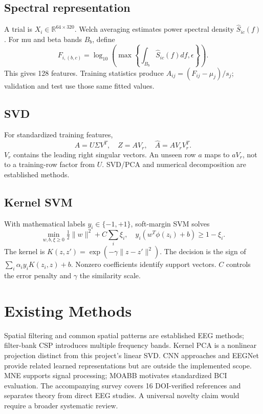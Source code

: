\documentclass[conference]{IEEEtran}
\begin{document}
\subsection{Spectral representation}
A trial is $X_i\in\mathbb{R}^{64\times320}$. Welch averaging estimates power spectral
density $\widehat S_{ic}(f)$\cite{ref13}. For mu and beta bands $B_b$, define
\begin{equation}
F_{i,(b,c)}=\log_{10}\left(\max\left\{\int_{B_b}\widehat S_{ic}(f)df,\epsilon\right\}\right).
\end{equation}
This gives 128 features. Training statistics produce
$A_{ij}=(F_{ij}-\mu_j)/s_j$; validation and test use those same fitted values.
\subsection{SVD}
For standardized training features,
\begin{equation}
A=U\Sigma V^T,\quad Z=AV_r,\quad \widehat A=AV_rV_r^T.
\end{equation}
$V_r$ contains the leading right singular vectors. An unseen row $a$ maps to
$aV_r$, not to a training-row factor from $U$. SVD/PCA and numerical decomposition
are established methods\cite{ref10,ref11,ref12}.
\subsection{Kernel SVM}
With mathematical labels $y_i\in\{-1,+1\}$, soft-margin SVM solves\cite{ref7,ref8}
\begin{equation}
\min_{w,b,\xi\geq0}\tfrac12\|w\|^2+C\sum_i\xi_i,
\quad y_i(w^T\phi(z_i)+b)\geq1-\xi_i.
\end{equation}
The kernel is $K(z,z')=\exp(-\gamma\|z-z'\|^2)$. The decision is the sign of
$\sum_i\alpha_i y_iK(z_i,z)+b$. Nonzero coefficients identify support vectors.
$C$ controls the error penalty and $\gamma$ the similarity scale.

\section{Existing Methods}
Spatial filtering and common spatial patterns are established EEG methods\cite{ref4,ref5};
filter-bank CSP introduces multiple frequency bands\cite{ref6}. Kernel PCA is a
nonlinear projection distinct from this project's linear SVD\cite{ref9}.
CNN approaches and EEGNet provide related learned representations but are outside
the implemented scope\cite{ref14,ref15}. MNE supports signal processing\cite{ref2};
MOABB motivates standardized BCI evaluation\cite{ref16}. The accompanying survey
covers 16 DOI-verified references and separates theory from direct EEG studies.
A universal novelty claim would require a broader systematic review.
\end{document}
